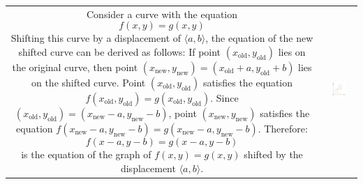 \documentclass{article}
\begin{document}
\begin{tabular}{cc}
\parbox{0.5\textwidth}{
Consider a curve with the equation 
\[f(x,y) = g(x,y)\] 
Shifting this curve by a displacement of \(\langle a, b \rangle\), the equation of the new shifted curve can be derived as follows: If point \((x_\text{old}, y_\text{old})\) lies on the original curve, then point \((x_\text{new}, y_\text{new}) = (x_\text{old}+a, y_\text{old}+b)\) lies on the shifted curve. Point \((x_\text{old}, y_\text{old})\) satisfies the equation \(f(x_\text{old},y_\text{old}) = g(x_\text{old},y_\text{old})\). Since \((x_\text{old}, y_\text{old}) = (x_\text{new}-a, y_\text{new}-b)\), point \((x_\text{new}, y_\text{new})\) satisfies the equation \(f(x_\text{new} - a, y_\text{new} - b) = g(x_\text{new} - a, y_\text{new} - b)\). Therefore:
\[f(x-a, y-b) = g(x-a, y-b)\] 
is the equation of the graph of \(f(x,y) = g(x,y)\) shifted by the displacement \(\langle a, b \rangle\).
} & \parbox{0.5\textwidth}{
\includegraphics[width = 0.5\textwidth]{translation_of_curves}
}
\end{tabular}
\end{document}
